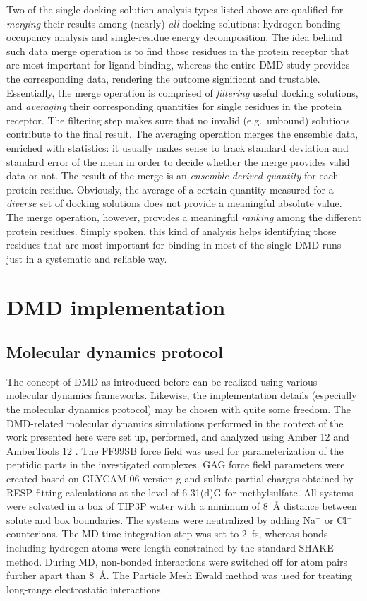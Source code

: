 Two of the single docking solution analysis types listed above are qualified for
\textit{merging} their results among (nearly) \textit{all} docking solutions:
hydrogen bonding occupancy analysis and single-residue energy decomposition. The
idea behind such data merge operation is to find those residues in the protein
receptor that are most important for ligand binding, whereas the entire DMD
study provides the corresponding data, rendering the outcome significant and
trustable. Essentially, the merge operation is comprised of \textit{filtering}
useful docking solutions, and \textit{averaging} their corresponding quantities
for single residues in the protein receptor. The filtering step makes sure that
no invalid (e.g.\ unbound) solutions contribute to the final result. The
averaging operation merges the ensemble data, enriched with statistics: it
usually makes sense to track standard deviation and standard error of the mean
in order to decide whether the merge provides valid data or not. The result of
the merge is an \textit{ensemble-derived quantity} for each protein residue.
Obviously, the average of a certain quantity measured for a \textit{diverse} set
of docking solutions does not provide a meaningful absolute value. The merge
operation, however, provides a meaningful \textit{ranking} among the different
protein residues. Simply spoken, this kind of analysis helps identifying those
residues that are most important for binding in most of the single DMD runs ---
just in a systematic and reliable way.


\section{DMD implementation}

\subsection{Molecular dynamics protocol}

The concept of DMD as introduced before can be realized using various molecular
dynamics frameworks. Likewise, the implementation details (especially the
molecular dynamics protocol) may be chosen with quite some freedom. The
DMD-related molecular dynamics simulations performed in the context of the work
presented here were set up, performed, and analyzed using Amber 12 and
AmberTools 12 \cite{case_amber_11}. The FF99SB force field was used for
parameterization of the peptidic parts in the investigated complexes. GAG force
field parameters were created based on GLYCAM 06 version g
\cite{kirschner_glycam06:_2008} and sulfate partial charges obtained by RESP
fitting calculations at the level of 6-31(d)G for methylsulfate. All systems
were solvated in a box of TIP3P water with a minimum of \SI{8}{\angstrom}
distance between solute and box boundaries. The systems were neutralized by
adding Na$^{+}$ or Cl$^{-}$ counterions. The MD time integration step was set to
\SI{2}{\femto\second}, whereas bonds including hydrogen atoms were
length-constrained by the standard SHAKE method. During MD, non-bonded
interactions were switched off for atom pairs further apart than
\SI{8}{\angstrom}. The Particle Mesh Ewald method was used for treating
long-range electrostatic interactions.

